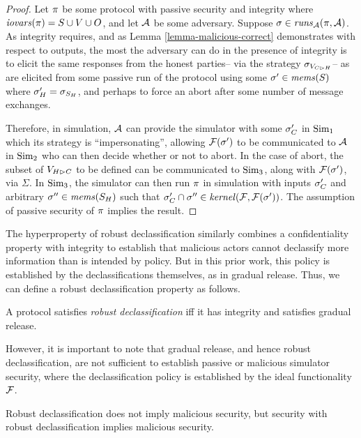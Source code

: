 \begin{proof}
  Let $\pi$ be some protocol with passive security and integrity
  where $\mathit{iovars}(\pi) = S \cup V \cup O$, and let $\mathcal{A}$ be some
  adversary. Suppose $\sigma \in \mathit{runs}_{\mathcal{A}}(\pi,\mathcal{A})$.
  As integrity requires, and as Lemma \ref{lemma-malicious-correct}
  demonstrates with respect to outputs, the most the adversary can do
  in the presence of integrity is to elicit the same responses from
  the honest parties-- via the strategy $\sigma_{V_{C \rhd H}}$-- as
  are elicited from some passive run of the protocol using
  some $\sigma' \in \mathit{mems}(S)$ where $\sigma'_H = \sigma_{S_H}$,
  and perhaps to force an abort after some number of message
  exchanges.

  Therefore, in simulation, $\mathcal{A}$ can provide the simulator
  with some $\sigma'_C$ in $\mathrm{Sim}_1$ which its strategy is ``impersonating'',
  allowing $\mathcal{F}(\sigma')$ to
  be communicated to $\mathcal{A}$ in $\mathrm{Sim}_2$ who can then
  decide whether or not to abort. In the case of abort, the
  subset of $V_{H \rhd C}$ to be defined can be communicated to
  $\mathrm{Sim}_3$, along with $\mathcal{F}(\sigma')$, via $\Sigma$. 
  In $\mathrm{Sim}_3$, the simulator can then run $\pi$ in simulation
  with inputs $\sigma'_C$ and arbitrary $\sigma'' \in \mathit{mems}(S_H)$
  such that $\sigma'_C \cap \sigma'' \in \mathit{kernel}(\mathcal{F},\mathcal{F}(\sigma'))$.
  The assumption of passive security of $\pi$ implies the result.
\end{proof}

The hyperproperty of robust declassification \cite{930133} similarly
combines a confidentiality property with integrity to establish that
malicious actors cannot declassify more information than is intended
by policy. But in this prior work, this policy is established
by the declassifications themselves, as in gradual release.
Thus, we can define a robust declassification property as follows. 
\begin{definition}
  A protocol satisfies \emph{robust declassification} iff it has integrity and
  satisfies gradual release. 
\end{definition}
However, it is important to note that gradual release, and
hence robust declassification, are not sufficient to establish
passive or malicious simulator security, where the declassification
policy is established by the ideal functionality $\mathcal{F}$. 
\begin{theorem}
  Robust declassification does not imply malicious security, but
  security with robust declassification implies malicious security.
\end{theorem}

